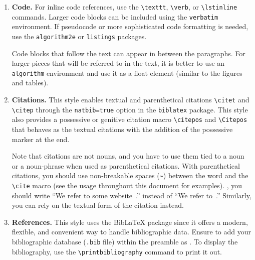 \documentclass[abstract]{nldl}
\begin{document}
\begin{enumerate}[leftmargin=*]
Variables in mathematical expressions should ideally be represented by a single letter, both for subscripts and superscripts.
In cases where more context or clarity is required by including words or multiple letters, you should escape the word using \verb|\mathit|, \verb|\text|, or \verb|\mathrm|.
For example:
\begin{equation}
  \mathbf{w}^{\text{(new)}} = \mathbf{w}^{\text{(old)}} - \alpha \frac{\partial \mathcal{L}(\mathbf{w}^{\text{(old)}})}{\partial \mathbf{w}}.
\end{equation}
But you should prefer to use $\mathbf{w}^{t}$ instead of the word based superscripts.
The mathematics in the manuscript should flow within the language and should not appear as standalone pieces.
You are recommended to review the work of \citet{Knuth1989}.

\item \textbf{Code.}
For inline code references, use the \verb|\texttt|, \verb|\verb|, or \verb|\lstinline| commands.
Larger code blocks can be included using the \verb|verbatim| environment.
If pseudocode or more sophisticated code formatting is needed, use the \verb|algorithm2e| or \verb|listings| packages.

Code blocks that follow the text can appear in between the paragraphs.
For larger pieces that will be referred to in the text, it is better to use an \verb|algorithm| environment and use it as a float element (similar to the figures and tables).

\item \textbf{Citations.}
This style enables textual and parenthetical citations \verb|\citet| and \verb|\citep| through the \verb|natbib=true| option in the \verb|biblatex| package.
This style also provides a possessive or genitive citation macro \verb|\citepos| and \verb|\Citepos| that behaves as the textual citations with the addition of the possessive marker at the end.

Note that citations are not nouns, and you have to use them tied to a noun or a noun-phrase when used as parenthetical citations.
With parenthetical citations, you should use non-breakable spaces (\verb|~|) between the word and the \verb|\cite| macro (see the usage throughout this document for examples).
\Eg, you should write ``We refer to some website~\citep{tromso}.''  instead of ``We refer to~\citep{tromso}.''
Similarly, you can rely on the textual form of the citation instead.

\item \textbf{References.}
This style uses the BibLaTeX package since it offers a modern, flexible, and convenient way to handle bibliographic data.
Ensure to add your bibliographic database (\verb|.bib| file) within the preamble as \verb||.
To display the bibliography, use the \verb|\printbibliography| command to print it out.


\end{enumerate}
\end{document}
